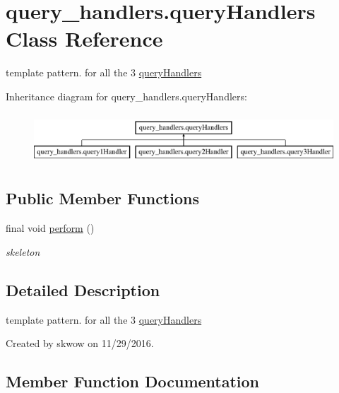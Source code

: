 \hypertarget{classquery__handlers_1_1query_handlers}{}\section{query\+\_\+handlers.\+query\+Handlers Class Reference}
\label{classquery__handlers_1_1query_handlers}


template pattern. for all the 3 \hyperlink{classquery__handlers_1_1query_handlers}{query\+Handlers}  


Inheritance diagram for query\+\_\+handlers.\+query\+Handlers\+:\begin{figure}[H]
\begin{center}
\leavevmode
\includegraphics[height=1.904762cm]{classquery__handlers_1_1query_handlers}
\end{center}
\end{figure}
\subsection*{Public Member Functions}
\begin{DoxyCompactItemize}
\item 
final void \hyperlink{classquery__handlers_1_1query_handlers_a2ffd93ab8225b054b72f8a99b45bed2f}{perform} ()
\begin{DoxyCompactList}\small\item\em skeleton \end{DoxyCompactList}\end{DoxyCompactItemize}


\subsection{Detailed Description}
template pattern. for all the 3 \hyperlink{classquery__handlers_1_1query_handlers}{query\+Handlers} 

Created by skwow on 11/29/2016. 

\subsection{Member Function Documentation}
\hypertarget{classquery__handlers_1_1query_handlers_a2ffd93ab8225b054b72f8a99b45bed2f}{}\label{classquery__handlers_1_1query_handlers_a2ffd93ab8225b054b72f8a99b45bed2f} 
